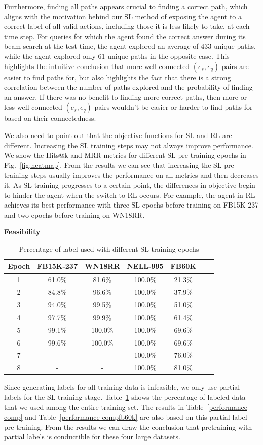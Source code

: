 \documentclass[lettersize,journal]{IEEEtran}
\begin{document}
Furthermore, finding all paths appears crucial to finding a correct path, which aligns with the motivation behind our SL method of exposing the agent to a correct label of all valid actions, including those it is less likely to take, at each time step. For queries for which the agent found the correct answer during its beam search at the test time, the agent explored an average of 433 unique paths, while the agent explored only 61 unique paths in the opposite case. This highlights the intuitive conclusion that more well-connected $\left(e_s, e_q\right)$ pairs are easier to find paths for, but also highlights the fact that there is a strong correlation between the number of paths explored and the probability of finding an answer. If there was no benefit to finding more correct paths, then more or less well connected $\left(e_s, e_q\right)$ pairs wouldn’t be easier or harder to find paths for based on their connectedness.


We also need to point out that the objective functions for SL and RL are different. Increasing the SL training steps may not always improve performance. We show the Hits@k and MRR metrics for different SL pre-training epochs in Fig.~\ref{fig:heatmap}. From the results we can see that increasing the SL pre-training steps usually improves the performance on all metrics and then decreases it. As SL training progresses to a certain point, the differences in objective begin to hinder the agent when the switch to RL occurs. For example, the agent in RL achieves its best performance with three SL epochs before training on FB15K-237 and two epochs before training on WN18RR. 


\textbf{Feasibility}
\begin{table}
\caption{Percentage of label used with different SL training epochs
}
\centering
\begin{tabular}{ccccccc}
\hline
Epoch & FB15K-237 &WN18RR & NELL-995 &FB60K\\
\hline
1 & 61.0\% & 81.6\% & 100.0\%  & 21.3\% \\
2 & 84.8\% & 96.6\% & 100.0\%  & 37.9\% \\
3 &  94.0\%  & 99.5\% & 100.0\% & 51.0\%  \\
4 &  97.7\%& 99.9\%& 100.0\%  & 61.4\% \\
5 &  99.1\% & 100.0\%& 100.0\%  & 69.6\% \\
6 &  99.6\% & 100.0\%& 100.0\%  & 69.6\% \\
7 &  -& -& 100.0\%  & 76.0\% \\
8 &  - & -& 100.0\%  & 81.0\% \\
\hline
\end{tabular}

\label{label usage}
\end{table}
Since generating labels for all training data is infeasible, we only use partial labels for the SL training stage. Table~\ref{label usage} shows the percentage of labeled data that we used among the entire training set. The results in Table~\ref{performance comp} and Table~\ref{performance compfb60k} are also based on this partial label pre-training. From the results we can draw the conclusion that pretraining with partial labels is conductible for these four large datasets.
\end{document}
